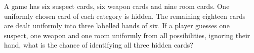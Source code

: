 A game has six suspect cards, six weapon cards and nine room cards. One uniformly chosen card of each category is hidden. The remaining eighteen cards are dealt uniformly into three labelled hands of six. If a player guesses one suspect, one weapon and one room uniformly from all possibilities, ignoring their hand, what is the chance of identifying all three hidden cards?
